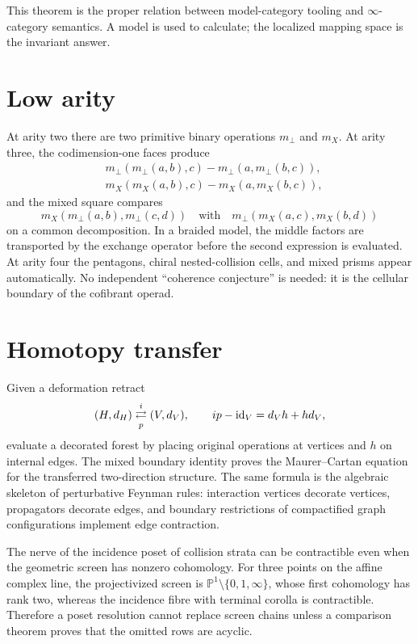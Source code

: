 This theorem is the proper relation between model-category tooling and \(\infty\)-category semantics.  A model is used to calculate; the localized mapping space is the invariant answer.

\section{Low arity}
At arity two there are two primitive binary operations \(m_\perp\) and \(m_X\).  At arity three, the codimension-one faces produce
\begin{align*}
 &m_\perp(m_\perp(a,b),c)-m_\perp(a,m_\perp(b,c)),\\
 &m_X(m_X(a,b),c)-m_X(a,m_X(b,c)),
\end{align*}
and the mixed square compares
\[
 m_X(m_\perp(a,b),m_\perp(c,d))
 \quad\text{with}\quad
 m_\perp(m_X(a,c),m_X(b,d))
\]
on a common decomposition.  In a braided model, the middle factors are transported by the exchange operator before the second expression is evaluated.  At arity four the pentagons, chiral nested-collision cells, and mixed prisms appear automatically.  No independent ``coherence conjecture'' is needed: it is the cellular boundary of the cofibrant operad.

\section{Homotopy transfer}
Given a deformation retract
\[
 (H,d_H)\underset{p}{\stackrel{i}{\rightleftarrows}}(V,d_V),
 \qquad ip-\operatorname{id}_V=d_Vh+hd_V,
\]
evaluate a decorated forest by placing original operations at vertices and \(h\) on internal edges.  The mixed boundary identity proves the Maurer--Cartan equation for the transferred two-direction structure.  The same formula is the algebraic skeleton of perturbative Feynman rules: interaction vertices decorate vertices, propagators decorate edges, and boundary restrictions of compactified graph configurations implement edge contraction.

\begin{nogobox}[title={No-go theorem 6: incidence is not screen geometry}]
The nerve of the incidence poset of collision strata can be contractible even when the geometric screen has nonzero cohomology.  For three points on the affine complex line, the projectivized screen is \(\mathbb P^1\setminus\{0,1,\infty\}\), whose first cohomology has rank two, whereas the incidence fibre with terminal corolla is contractible.  Therefore a poset resolution cannot replace screen chains unless a comparison theorem proves that the omitted rows are acyclic.
\end{nogobox}
